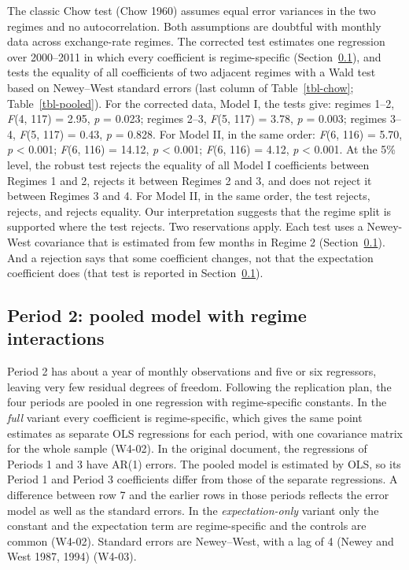 \documentclass[
  12pt,
  a4paper,
]{article}
\begin{document}
The classic Chow test (Chow 1960) assumes equal error variances in the
two regimes and no autocorrelation. Both assumptions are doubtful with
monthly data across exchange-rate regimes. The corrected test estimates
one regression over 2000--2011 in which every coefficient is
regime-specific (Section~\ref{sec-pooled}), and tests the equality of
all coefficients of two adjacent regimes with a Wald test based on
Newey--West standard errors (last column of Table~\ref{tbl-chow};
Table~\ref{tbl-pooled}). For the corrected data, Model I, the tests
give: regimes 1--2, \emph{F}(4, 117) = 2.95, \emph{p} = 0.023; regimes
2--3, \emph{F}(5, 117) = 3.78, \emph{p} = 0.003; regimes 3--4,
\emph{F}(5, 117) = 0.43, \emph{p} = 0.828. For Model II, in the same
order: \emph{F}(6, 116) = 5.70, \emph{p} \textless{} 0.001; \emph{F}(6,
116) = 14.12, \emph{p} \textless{} 0.001; \emph{F}(6, 116) = 4.12,
\emph{p} \textless{} 0.001. At the 5\% level, the robust test rejects
the equality of all Model I coefficients between Regimes 1 and 2,
rejects it between Regimes 2 and 3, and does not reject it between
Regimes 3 and 4. For Model II, in the same order, the test rejects,
rejects, and rejects equality. Our interpretation suggests that the
regime split is supported where the test rejects. Two reservations
apply. Each test uses a Newey-West covariance that is estimated from few
months in Regime 2 (Section~\ref{sec-pooled}). And a rejection says that
some coefficient changes, not that the expectation coefficient does
(that test is reported in Section~\ref{sec-pooled}).

\subsection{Period 2: pooled model with regime
interactions}\label{sec-pooled}

Period 2 has about a year of monthly observations and five or six
regressors, leaving very few residual degrees of freedom. Following the
replication plan, the four periods are pooled in one regression with
regime-specific constants. In the \emph{full} variant every coefficient
is regime-specific, which gives the same point estimates as separate OLS
regressions for each period, with one covariance matrix for the whole
sample (W4-02). In the original document, the regressions of Periods 1
and 3 have AR(1) errors. The pooled model is estimated by OLS, so its
Period 1 and Period 3 coefficients differ from those of the separate
regressions. A difference between row 7 and the earlier rows in those
periods reflects the error model as well as the standard errors. In the
\emph{expectation-only} variant only the constant and the expectation
term are regime-specific and the controls are common (W4-02). Standard
errors are Newey--West, with a lag of 4 (Newey and West 1987, 1994)
(W4-03).
\end{document}
